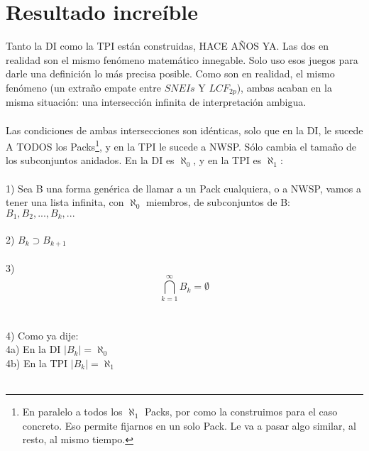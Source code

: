 	
	
	
	\newpage
	\section{Resultado increíble}
	
	\noindent
	Tanto la DI como la TPI están construidas, HACE AÑOS YA. Las dos en realidad son el mismo fenómeno matemático innegable. Solo uso esos juegos para darle una definición lo más precisa posible. Como son en realidad, el mismo fenómeno (un extraño empate entre $SNEIs$ Y $LCF_{2p}$), ambas acaban en la misma situación: una intersección infinita de interpretación ambigua.
	\\\\
	
	\noindent
	Las condiciones de ambas intersecciones son idénticas, solo que en la DI, le sucede A TODOS los Packs\footnote{En paralelo a todos los $\aleph_{1}$ Packs, por como la construimos para el caso concreto. Eso permite fijarnos en un solo Pack. Le va a pasar algo similar, al resto, al mismo tiempo.}, y en la TPI le sucede a NWSP. Sólo cambia el tamaño de los subconjuntos anidados. En la DI es $\aleph_{0}$, y en la TPI es $\aleph_{1}$:\\\\
	1) Sea B una forma genérica de llamar a un Pack cualquiera, o a NWSP, vamos a tener una lista infinita, con $\aleph_{0}$ miembros, de subconjuntos de B:\\
	$B_{1}, B_{2}, ... , B_{k}, ...$\\\\
	2) $ B_{k} \supset B_{k+1} $ \\\\
	3) $$ \bigcap_{k=1}^{\infty} B_{k} = \emptyset $$\\\\
	4) Como ya dije:\\
	4a) En la DI \textrightarrow $|B_{k}| = \aleph_{0}$\\
	4b) En la TPI \textrightarrow $|B_{k}| = \aleph_{1}$\\\\
